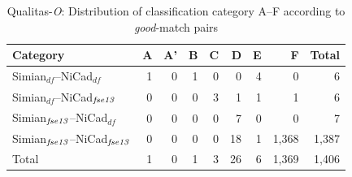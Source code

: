 \documentclass{IEEEtran}
\begin{document}

\begin{table}[H]
	\centering
	\caption{Qualitas-\textit{O}: Distribution of classification category A--F according to \textit{good}-match pairs}
	\label{tab:good_classification}
	\begin{tabular}{|l|r|r|r|r|r|r|r|r|}
		\hline 
		Category   & A   & 	A'   & 	B   & C   & D   &	E   &	F   & Total  \\
		\hline
		Simian$_{\mathrm{\textit{df}}}$--NiCad$_{\mathrm{\textit{df}}}$   & 1 & 0 & 1 & 0 & 0 & 4 & 0 & 6 \\
		Simian$_{\mathrm{\textit{df}}}$--NiCad$_{\textrm{\textit{fse13}}}$   & 0 & 0 & 0 & 3 & 1 & 1 & 1 & 6 \\
		Simian$_{\textrm{\textit{fse13}}}$--NiCad$_{\mathrm{\textit{df}}}$   & 0 & 0 & 0 & 0 & 7 & 0 & 0 & 7 \\
		Simian$_{\textrm{\textit{fse13}}}$--NiCad$_{\textrm{\textit{fse13}}}$   & 0 & 0 & 0 & 0 & 18 & 1 & 1,368 & 1,387 \\
		\hline
		Total   &   1   &   0   &   1   &   3   &   26   &   6   & 1,369  & 1,406 \\
		\hline
	\end{tabular} 
\end{table}
\end{document}
